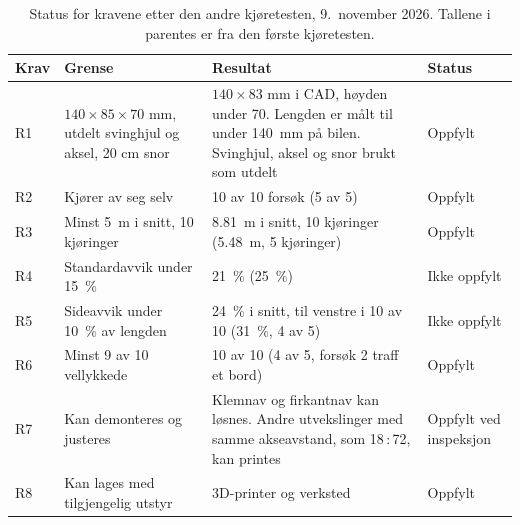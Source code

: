 \begin{table}[H]
    \centering
    \caption[Status for kravene]{Status for kravene etter den andre kjøretesten, 9.~november 2026. Tallene i parentes er fra den første kjøretesten.}
    \label{tab:kravstatus}
    \small
    \renewcommand{\arraystretch}{1.3}
    \begin{tabular}{|l|p{3.9cm}|p{5.1cm}|l|}
        \hline
        \textbf{Krav} & \textbf{Grense} & \textbf{Resultat} & \textbf{Status} \\
        \hline
        R1 & $140 \times 85 \times 70$ mm, utdelt svinghjul og aksel, 20 cm snor & $140 \times 83$ mm i CAD, høyden under 70. Lengden er målt til under \SI{140}{mm} på bilen. Svinghjul, aksel og snor brukt som utdelt & Oppfylt \\
        \hline
        R2 & Kjører av seg selv & 10 av 10 forsøk (5 av 5) & Oppfylt \\
        \hline
        R3 & Minst \SI{5}{m} i snitt, 10 kjøringer & \SI{8,81}{m} i snitt, 10 kjøringer (\SI{5,48}{m}, 5 kjøringer) & Oppfylt \\
        \hline
        R4 & Standardavvik under \SI{15}{\percent} & \SI{21}{\percent} (\SI{25}{\percent}) & Ikke oppfylt \\
        \hline
        R5 & Sideavvik under \SI{10}{\percent} av lengden & \SI{24}{\percent} i snitt, til venstre i 10 av 10 (\SI{31}{\percent}, 4 av 5) & Ikke oppfylt \\
        \hline
        R6 & Minst 9 av 10 vellykkede & 10 av 10 (4 av 5, forsøk 2 traff et bord) & Oppfylt \\
        \hline
        R7 & Kan demonteres og justeres & Klemnav og firkantnav kan løsnes. Andre utvekslinger med samme akseavstand, som 18\,:\,72, kan printes & Oppfylt ved inspeksjon \\
        \hline
        R8 & Kan lages med tilgjengelig utstyr & 3D-printer og verksted & Oppfylt \\
        \hline
    \end{tabular}
\end{table}

